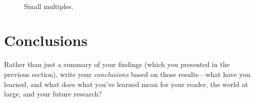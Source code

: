 \documentclass[thesis]{hmcposter}
\begin{document}
\begin{poster}
\begin{figure}
{                \label{fig:small-mults-45}%
        }\\
        \qquad\qquad
  \caption[Small multiples]{Small multiples.}%
  \label{fig:small-multiples}
\end{figure}

\columnbreak

\section{Conclusions}

Rather than just a summary of your findings (which you presented in
the previous section), write your \emph{conclusions} based on those
results---what have you learned, and what does what you've learned
mean for your reader, the world at large, and your future research?


\end{poster}
\end{document}
